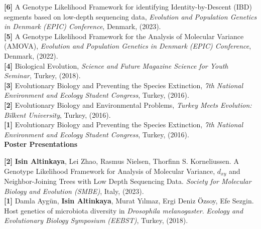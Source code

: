 \documentclass[letterpaper,10.5pt]{article}
\begin{document}
\textbf{[6]} \hspace{0.42cm} {A Genotype Likelihood Framework for identifying Identity-by-Descent (IBD) segments
based on low-depth sequencing data}, \textit{Evolution and Population Genetics in Denmark (EPIC) Conference}, Denmark, (2023). \\
\textbf{[5]} \hspace{0.42cm} {A Genotype Likelihood Framework for the Analysis of Molecular Variance (AMOVA)}, \textit{Evolution and Population Genetics in Denmark (EPIC) Conference}, Denmark, (2022). \\
\smallskip
\textbf{[4]} \hspace{0.42cm} {Biological Evolution}, \textit{Science and Future Magazine Science for Youth Seminar}, Turkey, (2018). \\
\smallskip
\textbf{[3]} \hspace{0.42cm} {Evolutionary Biology and Preventing the Species Extinction}, \textit{7th National Environment and Ecology Student Congress}, Turkey, (2016). \\
\smallskip
\textbf{[2]} \hspace{0.42cm} {Evolutionary Biology and Environmental Problems}, \textit{Turkey Meets Evolution: Bilkent University}, Turkey, (2016). \\
\smallskip
\textbf{[1]} \hspace{0.42cm} {Evolutionary Biology and Preventing the Species Extinction}, \textit{7th National Environment and Ecology Student Congress}, Turkey, (2016). \\

\medskip
\textbf{Poster Presentations}
\medskip

\textbf{[2]} \hspace{0.42cm}  \textbf{Isin Altinkaya}, Lei Zhao, Rasmus Nielsen, Thorfinn S. Korneliussen. A Genotype Likelihood Framework for Analysis of Molecular Variance, $d_{xy}$ and Neighbor-Joining Trees with Low Depth Sequencing Data. \textit{Society for Molecular Biology and Evolution (SMBE)}, Italy, (2023). \\


\textbf{[1]} \hspace{0.42cm} Damla Aygün, \textbf{Isin Altinkaya}, Murat Y{\i}lmaz, Ergi Deniz \"{O}zsoy, Efe Sezgin. Host genetics of microbiota diversity in \textit{Drosophila melanogaster}. \textit{Ecology and Evolutionary Biology Symposium (EEBST)}, Turkey, (2018). \\
\end{document}
